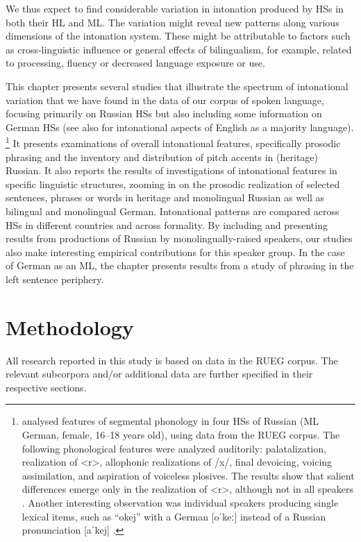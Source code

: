 \documentclass[output=paper,colorlinks,citecolor=brown]{langscibook}
\begin{document}
We thus expect to find considerable variation in intonation produced by HSs in both their HL and ML. The variation might reveal new patterns along various dimensions of the intonation system. These might be attributable to factors such as cross-linguistic influence or general effects of bilingualism, for example, related to processing, fluency or decreased language exposure or use.

This chapter presents several studies that illustrate the spectrum of intonational variation that we have found in the data of our corpus of spoken language, focusing primarily on Russian HSs but also including some information on German HSs (see also \cite{chapters/13} for intonational aspects of English as a majority language).
\footnote{\citet{Wandrei_2019} analysed features of segmental phonology in four HSs of Russian (ML German, female, 16--18 years old), using data from the RUEG corpus. The following phonological features were analyzed auditorily: palatalization, realization of <r>, allophonic realizations of /x/, final devoicing, voicing assimilation, and aspiration of voiceless plosives. The results show that salient differences emerge only in the realization of <r>, although not in all speakers \citep[32]{Wandrei_2019}. Another interesting observation was individual speakers producing single lexical items, such as “okej” with a German [oˈkeː] instead of a Russian pronunciation [aˈkej] \citep[34]{Wandrei_2019}.} It presents examinations of overall intonational features, specifically prosodic phrasing and the inventory and distribution of pitch accents in (heritage) Russian. It also reports the results of investigations of intonational features in specific linguistic structures, zooming in on the prosodic realization of selected sentences, phrases or words in heritage and monolingual Russian as well as bilingual and monolingual German. Intonational patterns are compared across HSs in different countries and across formality. By including and presenting results from productions of Russian by monolingually-raised speakers, our studies also make interesting empirical contributions for this speaker group. In the case of German as an ML, the chapter presents results from a study of phrasing in the left sentence periphery. 


\section{Methodology} \label{chapter12:section 2}
All research reported in this study is based on data in the RUEG corpus. The relevant subcorpora and/or additional data are further specified in their respective sections.
\end{document}

